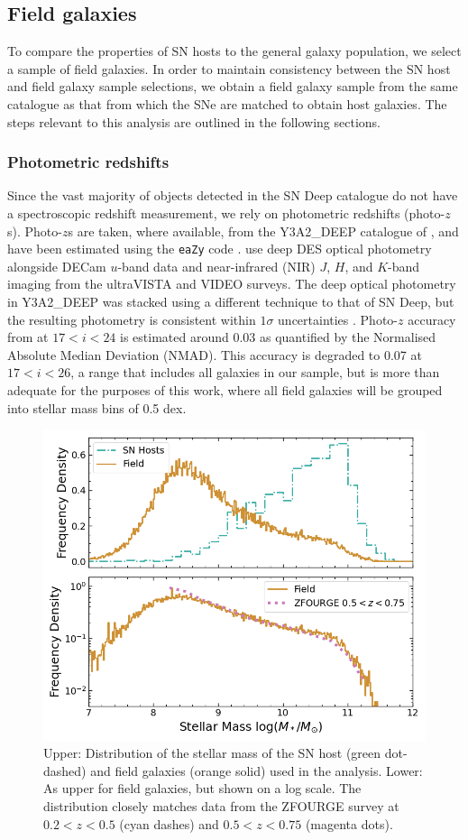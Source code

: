 \documentclass[fleqn,usenatbib]{mnras}
\begin{document}
\subsection{Field galaxies\label{subsec:field_sample}}

To compare the properties of SN hosts to the general galaxy population, we select a sample of field galaxies. In order to maintain consistency between the SN host and field galaxy sample selections, we obtain a field galaxy sample from the same catalogue as that from which the SNe are matched to obtain host galaxies. The steps relevant to this analysis are outlined in the following sections.

\subsubsection{Photometric redshifts \label{subsubsec:photozs}}

Since the vast majority of objects detected in the SN Deep catalogue do not have a spectroscopic redshift measurement, we rely on photometric redshifts (photo-$z$s).
Photo-$z$s are taken, where available, from the Y3A2\_DEEP catalogue of \citet{Hartley2020}, and have been estimated using the \texttt{eaZy} code \citep{Brammer2008}. \citet{Hartley2020} use deep DES optical photometry alongside DECam $u$-band data and near-infrared (NIR) $J$, $H$, and $K$-band imaging from the ultraVISTA and VIDEO surveys. The deep optical photometry in Y3A2\_DEEP was stacked using a different technique to that of SN Deep, but the resulting photometry is consistent within $1\sigma$ uncertainties \citep{Wiseman2020}. Photo-$z$ accuracy from \citet{Hartley2020} at $17 < i<24$ is estimated around 0.03 as quantified by the Normalised Absolute Median Deviation (NMAD). This accuracy is degraded to 0.07 at $17 < i<26$, a range that includes all galaxies in our sample, but is more than adequate for the purposes of this work, where all field galaxies will be grouped into stellar mass bins of 0.5 dex.

\begin{figure}
    \centering
    \includegraphics[width=.5\textwidth]{figs/mass_hist_linlog_sn_field_BC03.png}
    \caption{Upper: Distribution of the stellar mass of the SN host (green dot-dashed) and field galaxies (orange solid) used in the analysis. Lower: As upper for field galaxies, but shown on a log scale.  The distribution closely matches data from the ZFOURGE survey at $0.2<z<0.5$ (cyan dashes) and $0.5<z<0.75$ (magenta dots).}
    \label{fig:mass_hist_hosts_field}
\end{figure}
\end{document}

